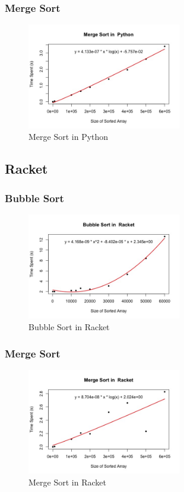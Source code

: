 \documentclass[]{report}
\begin{document}
		 		\subsubsection{Merge Sort}
					\begin{figure}[H]
						\centering
						\includegraphics[width=0.6\textwidth]{resources/visualizations/mergesortpython.jpeg}
						\caption{Merge Sort in Python}
					\end{figure}
					
		    \subsection{Racket}
		    
		 		\subsubsection{Bubble Sort}
					\begin{figure}[H]
						\centering
						\includegraphics[width=0.6\textwidth]{resources/visualizations/bubblesortracket.jpeg}
						\caption{Bubble Sort in Racket}
					\end{figure}

		 		\subsubsection{Merge Sort}
					\begin{figure}[H]
						\centering
						\includegraphics[width=0.6\textwidth]{resources/visualizations/mergesortracket.jpeg}
						\caption{Merge Sort in Racket}
					\end{figure}
					
\end{document}
